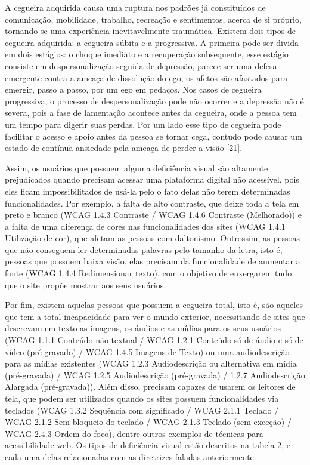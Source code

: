 \documentclass[a4paper]{article}
\begin{document}
\begin{titlepage}
A cegueira adquirida causa uma ruptura nos padrões já constituídos de comunicação, mobilidade, trabalho, recreação e sentimentos, acerca de si próprio, tornando-se uma experiência inevitavelmente traumática. Existem dois tipos de cegueira adquirida: a cegueira súbita e a progressiva. A primeira pode ser divida em dois estágios: o choque imediato e a recuperação subsequente, esse estágio consiste em despersonalização seguida de depressão, parece ser uma defesa emergente contra a ameaça de dissolução do ego, os afetos são afastados para emergir, passo a passo, por um ego em pedaços. Nos casos de cegueira progressiva, o processo de despersonalização pode não ocorrer e a depressão não é severa, pois a fase de lamentação acontece antes da cegueira, onde a pessoa tem um tempo para digerir suas perdas. Por um lado esse tipo de cegueira pode facilitar o acesso e apoio antes da pessoa se tornar cega, contudo pode causar um estado de contínua ansiedade pela ameaça de perder a visão [21].

Assim, os usuários que possuem alguma deficiência visual são altamente prejudicados quando precisam acessar uma plataforma digital não acessível, pois eles ficam impossibilitados de usá-la pelo o fato delas não terem determinadas funcionalidades. Por exemplo, a falta de alto contraste, que deixe toda a tela em preto e branco (WCAG 1.4.3 Contraste / WCAG 1.4.6 Contraste (Melhorado)) e a falta de uma diferença de cores nas funcionalidades dos sites (WCAG 1.4.1 Utilização de cor), que afetam as pessoas com daltonismo. Outrossim, as pessoas que não conseguem ler determinadas palavras pelo tamanho da letra, isto é, pessoas que possuem baixa visão, elas precisam da funcionalidade de aumentar a fonte (WCAG 1.4.4 Redimensionar texto), com o objetivo de enxergarem tudo que o site propõe mostrar aos seus usuários.

Por fim, existem aquelas pessoas que possuem a cegueira total, isto é, são aqueles que tem a total incapacidade para ver o mundo exterior, necessitando de sites que descrevam em texto as imagens, os áudios e as mídias para os seus usuários (WCAG 1.1.1 Conteúdo não textual / WCAG 1.2.1 Conteúdo só de áudio e só de vídeo (pré gravado) / WCAG 1.4.5 Imagens de Texto) ou uma audiodescrição para as mídias existentes (WCAG 1.2.3 Audiodescrição ou alternativa em mídia (pré-gravada) / WCAG 1.2.5 Audiodescrição (pré-gravada) / 1.2.7 Audiodescrição Alargada (pré-gravada)). Além disso, precisam capazes de usarem os leitores de tela, que podem ser utilizados quando os sites possuem funcionalidades via teclados (WCAG 1.3.2 Sequência com significado / WCAG 2.1.1 Teclado / WCAG 2.1.2 Sem bloqueio do teclado / WCAG 2.1.3 Teclado (sem exceção) / WCAG 2.4.3 Ordem do foco), dentre outros exemplos de técnicas para acessibilidade web. Os tipos de deficiência visual estão descritos na tabela 2, e cada uma delas relacionadas com as diretrizes faladas anteriormente.\\


\end{titlepage}
\end{document}
